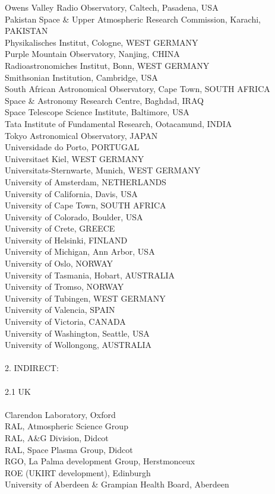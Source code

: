\begin{tabbing}
\>Owens Valley Radio Observatory, Caltech, Pasadena, USA\\
\>Pakistan Space \& Upper Atmospheric Research Commission, Karachi, PAKISTAN\\
\>Physikalisches Institut, Cologne, WEST GERMANY\\
\>Purple Mountain Observatory, Nanjing, CHINA\\
\>Radioastronomiches Institut, Bonn, WEST GERMANY\\
\>Smithsonian Institution, Cambridge, USA\\
\>South African Astronomical Observatory, Cape Town, SOUTH AFRICA\\
\>Space \& Astronomy Research Centre, Baghdad, IRAQ\\
\>Space Telescope Science Institute, Baltimore, USA\\
\>Tata Institute of Fundamental Research, Ootacamund, INDIA\\
\>Tokyo Astronomical Observatory, JAPAN\\
\>Universidade do Porto, PORTUGAL\\
\>Universitaet Kiel, WEST GERMANY\\
\>Universitats-Sternwarte, Munich, WEST GERMANY\\
\>University of Amsterdam, NETHERLANDS\\
\>University of California, Davis, USA\\
\>University of Cape Town, SOUTH AFRICA\\
\>University of Colorado, Boulder, USA\\
\>University of Crete, GREECE\\
\>University of Helsinki, FINLAND\\
\>University of Michigan, Ann Arbor, USA\\
\>University of Oslo, NORWAY\\
\>University of Tasmania, Hobart, AUSTRALIA\\
\>University of Tromso, NORWAY\\
\>University of Tubingen, WEST GERMANY\\
\>University of Valencia, SPAIN\\
\>University of Victoria, CANADA\\
\>University of Washington, Seattle, USA\\
\>University of Wollongong, AUSTRALIA\\
\\
2. INDIRECT:\\
\\
2.1 UK\\
\\
\>Clarendon Laboratory, Oxford\\
\>RAL, Atmospheric Science Group\\
\>RAL, A\&G Division, Didcot\\
\>RAL, Space Plasma Group, Didcot\\
\>RGO, La Palma development Group, Herstmonceux\\
\>ROE (UKIRT development), Edinburgh\\
\>University of Aberdeen \& Grampian Health Board, Aberdeen
\end{tabbing}

